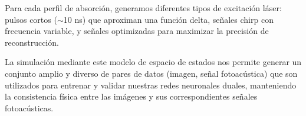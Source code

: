 Para cada perfil de absorción, generamos diferentes tipos de excitación láser: pulsos cortos ($\sim$10 ns) que aproximan una función delta, señales chirp con frecuencia variable, y señales optimizadas para maximizar la precisión de reconstrucción.

La simulación mediante este modelo de espacio de estados nos permite generar un conjunto amplio y diverso de pares de datos (imagen, señal fotoacústica) que son utilizados para entrenar y validar nuestras redes neuronales duales, manteniendo la consistencia física entre las imágenes y sus correspondientes señales fotoacústicas.